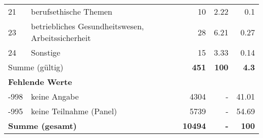 \begin{longtable}{lXrrr}
        21 & \multicolumn{1}{X}{berufsethische Themen} & %
          \num{10} &
          \num[round-mode=places,round-precision=2]{2,22} &
          \num[round-mode=places,round-precision=2]{0,1} \\

        23 & \multicolumn{1}{X}{betriebliches Gesundheitswesen, Arbeitssicherheit} & %
          \num{28} &
          \num[round-mode=places,round-precision=2]{6,21} &
          \num[round-mode=places,round-precision=2]{0,27} \\

        24 & \multicolumn{1}{X}{Sonstige} & %
          \num{15} &
          \num[round-mode=places,round-precision=2]{3,33} &
          \num[round-mode=places,round-precision=2]{0,14} \\

     \midrule
     \multicolumn{2}{l}{Summe (gültig)} &
       \textbf{\num{451}} &
     \textbf{100} &
       \textbf{\num[round-mode=places,round-precision=2]{4,3}} \\
     \multicolumn{5}{l}{\textbf{Fehlende Werte}}\\
       -998 &
       keine Angabe &
         \num{4304} &
        - &
         \num[round-mode=places,round-precision=2]{41,01} \\
       -995 &
       keine Teilnahme (Panel) &
         \num{5739} &
        - &
         \num[round-mode=places,round-precision=2]{54,69} \\
     \midrule
     \multicolumn{2}{l}{\textbf{Summe (gesamt)}} &
          \textbf{\num{10494}} &
        \textbf{-} &
        \textbf{100} \\
     \bottomrule
     \end{longtable}
     
